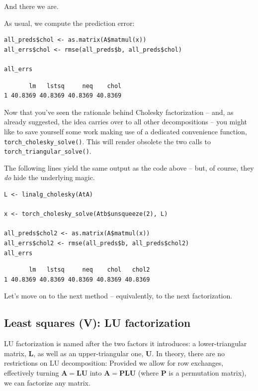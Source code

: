 \documentclass[
  letterpaper,
]{krantz}
\begin{document}
And there we are.

As usual, we compute the prediction error:

\begin{verbatim}
all_preds$chol <- as.matrix(A$matmul(x))
all_errs$chol <- rmse(all_preds$b, all_preds$chol)

all_errs
\end{verbatim}

\begin{verbatim}
       lm   lstsq     neq    chol
1 40.8369 40.8369 40.8369 40.8369
\end{verbatim}

Now that you've seen the rationale behind Cholesky factorization -- and,
as already suggested, the idea carries over to all other decompositions
-- you might like to save yourself some work making use of a dedicated
convenience function, \texttt{torch\_cholesky\_solve()}. This will
render obsolete the two calls to \texttt{torch\_triangular\_solve()}.

The following lines yield the same output as the code above -- but, of
course, they \emph{do} hide the underlying
magic.

\begin{verbatim}
L <- linalg_cholesky(AtA)

x <- torch_cholesky_solve(Atb$unsqueeze(2), L)

all_preds$chol2 <- as.matrix(A$matmul(x))
all_errs$chol2 <- rmse(all_preds$b, all_preds$chol2)
all_errs
\end{verbatim}

\begin{verbatim}
       lm   lstsq     neq    chol   chol2
1 40.8369 40.8369 40.8369 40.8369 40.8369
\end{verbatim}

Let's move on to the next method -- equivalently, to the next
factorization.

\hypertarget{least-squares-v-lu-factorization}{%
\subsection{\texorpdfstring{Least squares (V): LU
factorization}{Least squares (V): LU factorization}}\label{least-squares-v-lu-factorization}}

LU factorization is named after the two factors it introduces: a
lower-triangular matrix, \(\mathbf{L}\), as well as an upper-triangular
one, \(\mathbf{U}\). In theory, there are no restrictions on LU
decomposition: Provided we allow for row exchanges, effectively turning
\(\mathbf{A} = \mathbf{L}\mathbf{U}\) into
\(\mathbf{A} = \mathbf{P}\mathbf{L}\mathbf{U}\) (where \(\mathbf{P}\) is
a permutation matrix), we can factorize any matrix.
\end{document}
